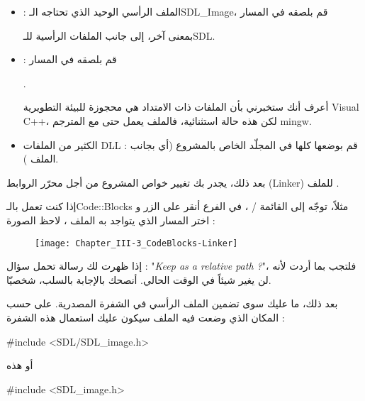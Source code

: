 \begin{itemize}
	\item {} :
	 الملف الرأسي الوحيد الذي تحتاجه الـ\textenglish{SDL\_Image}،
	 قم بلصقه في المسار
	 
	 
	 بمعنى آخر، إلى جانب الملفات الرأسية للـ\textenglish{SDL}.
	\item {} :
	قم بلصقه في المسار
	
	.
	
	أعرف أنك ستخبرني بأن الملفات ذات الامتداد
	هي محجوزة للبيئة التطويرية
	\textenglish{Visual C++}،
	لكن هذه حالة استثنائية، فالملف 
	يعمل حتى مع المترجم 
	\textenglish{mingw}.
	\item الكثير من الملفات
	\textenglish{DLL} : 
	قم بوضعها كلها في المجلّد الخاص بالمشروع (أي بجانب الملف 
	).
\end{itemize}

بعد ذلك، يجدر بك تغيير خواص المشروع من أجل محرّر الروابط
(\textenglish{Linker})
للملف
.

إذا كنت تعمل بالـ\textenglish{Code::Blocks}
مثلاً، توجّه إلى القائمة
 / ،
في الفرع
أنقر على الزر 
و اختر المسار الذي يتواجد به الملف
،
لاحظ الصورة :

\begin{figure}[H]
	\centering
	\texttt{[image: Chapter\_III-3\_CodeBlocks-Linker]}
\end{figure}

إذا ظهرت لك رسالة تحمل سؤال : 
"\textit{\textenglish{Keep as a relative path ?}}"،
فلتجب بما أردت لأنه لن يغير شيئاً في الوقت الحالي. أنصحك بالإجابة بالسلب، شخصيّا.

بعد ذلك، ما عليك سوى تضمين الملف الرأسي
في الشفرة المصدرية. على حسب المكان الذي وضعت فيه الملف
سيكون عليك استعمال هذه الشفرة :

\begin{Csource}
#include <SDL/SDL_image.h>
\end{Csource}

أو هذه

\begin{Csource}
#include <SDL_image.h>
\end{Csource}

